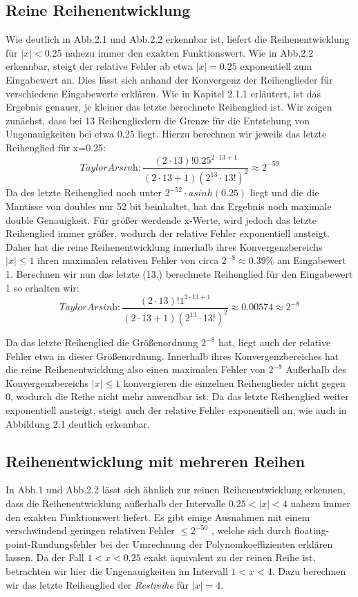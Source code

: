 \documentclass[course=erap] {aspdoc}
\begin{document}
    \subsection{Reine Reihenentwicklung}
    Wie deutlich in Abb.2.1 und Abb.2.2 erkennbar ist, liefert die Reihenentwicklung für $|x|<0.25$ nahezu immer den exakten Funktionswert.
    Wie in Abb.2.2 erkennbar, steigt der relative Fehler ab etwa $|x| = 0.25$ exponentiell zum Eingabewert an. Dies lässt sich anhand der Konvergenz der Reihenglieder für verschiedene Eingabewerte erklären. Wie in Kapitel 2.1.1 erläutert, ist das Ergebnis genauer, je kleiner das letzte berechnete Reihenglied ist.
    Wir zeigen zunächst, dass bei 13 Reihengliedern die Grenze für die Entstehung von Ungenauigkeiten bei etwa 0.25 liegt. Hierzu berechnen wir jeweils das letzte Reihenglied für x=0.25:
    \[
    \textit{TaylorArsinh}: \frac{(2\cdot13)!0.25^{2\cdot13 + 1}}{(2\cdot13 + 1)(2^13\cdot13!)^2} \approx 2^{-59}
    \]
    Da des letzte Reihenglied noch unter $2^{-52}\cdot asinh(0.25)$ liegt und die die Mantisse von doubles nur 52 bit beinhaltet, hat das Ergebnis noch maximale double Genauigkeit. Für größer werdende x-Werte, wird jedoch das letzte Reihenglied immer größer, wodurch der relative Fehler exponentiell ansteigt.  Daher hat die reine Reihenentwicklung innerhalb ihres Konvergenzbereichs $|x|\leq1$ ihren maximalen relativen Fehler von circa $2^{-8} \approx 0.39\%$ am Eingabewert 1.
    Berechnen wir nun das letzte (13.) berechnete Reihenglied für den Eingabewert 1 so erhalten wir:
    \[
    \textit{TaylorArsinh}: \frac{(2\cdot13)!1^{2\cdot13 + 1}}{(2\cdot13 + 1)(2^13\cdot13!)^2} \approx 0.00574 \approx 2^{-8}
    \]

    Da das letzte Reihenglied die Größenordnung $2^{-8}$ hat, liegt auch der relative Fehler etwa in dieser Größenordnung. Innerhalb ihres Konvergenzbereiches hat die reine Reihenentwicklung also einen maximalen Fehler von $2^{-8}$
    Außerhalb des Konvergenzbereichs $|x|\leq1$ konvergieren die einzelnen Reihenglieder nicht gegen 0, wodurch die Reihe nicht mehr anwendbar ist. Da das letzte Reihenglied weiter exponentiell ansteigt, steigt auch der relative Fehler exponentiell an, wie auch in Abbildung 2.1 deutlich erkennbar.

    \subsection{Reihenentwicklung mit mehreren Reihen}
    In Abb.1 und Abb.2.2 lässt sich ähnlich zur reinen Reihenentwicklung erkennen, dass die Reihenentwicklung außerhalb der Intervalle $0.25<|x|<4$ nahezu immer den exakten Funktionswert liefert. Es gibt einige Ausnahmen mit einem verschwindend geringen relativen Fehler $\leq2^{-50}$ , welche sich durch floating-point-Rundungsfehler bei der Umrechnung der Polynomkoeffizienten erklären lassen.
    Da der Fall $1<x<0.25$ exakt äquivalent zu der reinen Reihe ist, betrachten wir hier die Ungenauigkeiten im Intervall $1<x<4$. Dazu berechnen wir das letzte Reihenglied der \textit{Restreihe} für $|x|=4$.
\end{document}

